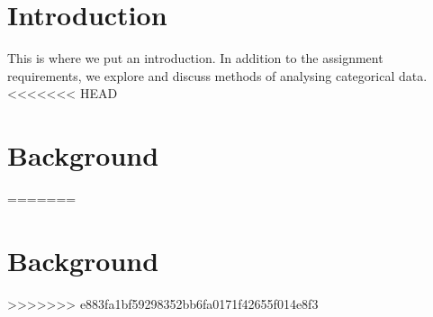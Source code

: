 \documentclass[12pt]{book}
\begin{document}

\tableofcontents
\pagebreak

\chapter{Introduction}
This is where we put an introduction.
In addition to the assignment requirements, we explore and discuss methods of analysing categorical data.
<<<<<<< HEAD

\chapter{Background}
=======
\chapter{Background}

>>>>>>> e883fa1bf59298352bb6fa0171f42655f014e8f3
\end{document}
